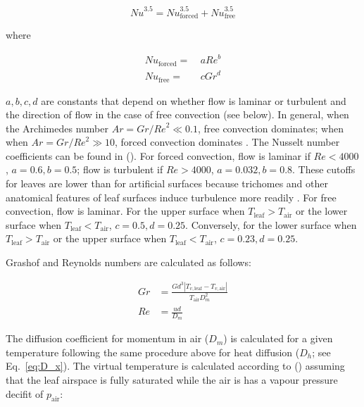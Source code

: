 \documentclass[11pt, oneside]{article}
\begin{document}
\begin{equation}
  \label{eq:nusselt}
  \mathit{Nu} ^ {3.5} = \mathit{Nu}_\mathrm{forced} ^ {3.5} + \mathit{Nu}_\mathrm{free} ^ {3.5}
\end{equation}

where

\begin{align}
  \mathit{Nu}_\mathrm{forced} =  & ~ a \mathit{Re} ^ b \\
  \mathit{Nu}_\mathrm{free} =    & ~ c \mathit{Gr} ^ d
\end{align}

$a, b, c, d$ are constants that depend on whether flow is laminar or turbulent and the direction of flow in the case of free convection (see below). In general, when the Archimedes number $\mathit{Ar} = \mathit{Gr} / \mathit{Re} ^ 2 \ll 0.1$, free convection dominates; when when $\mathit{Ar} = \mathit{Gr} / \mathit{Re} ^ 2 \gg 10$, forced convection dominates \citep{Nobel_2009}. The Nusselt number coefficients can be found in \citeauthor{Monteith_Unsworth_2013} (\citeyear{Monteith_Unsworth_2013}). For forced convection, flow is laminar if $\mathit{Re} < 4000$, $a = 0.6, b = 0.5$; flow is turbulent if $\mathit{Re} > 4000$, $a = 0.032, b = 0.8$. These cutoffs for leaves are lower than for artificial surfaces because trichomes and other anatomical features of leaf surfaces induce turbulence more readily \citep{Grace_Wilson_1976}. For free convection, flow is laminar. For the upper surface when $T_\mathrm{leaf} > T_\mathrm{air}$ or the lower surface when $T_\mathrm{leaf} < T_\mathrm{air}$, $c = 0.5, d = 0.25$. Conversely, for the lower surface when $T_\mathrm{leaf} > T_\mathrm{air}$ or the upper surface when $T_\mathrm{leaf} < T_\mathrm{air}$, $c = 0.23, d = 0.25$.

Grashof and Reynolds numbers are calculated as follows:

\begin{align}
  \mathit{Gr} & = \frac{G d ^ 3 |T_{v,\mathrm{leaf}} - T_{v,\mathrm{air}}|}{T_\mathrm{air} D_m ^ 2} \\
  \mathit{Re} & = \frac{u d}{D_m}
\end{align}

The diffusion coefficient for momentum in air ($D_m$) is calculated for a given temperature following the same procedure above for heat diffusion ($D_h$; see Eq.~\ref{eq:D_x}). The virtual temperature is calculated according to \citeauthor{Monteith_Unsworth_2013} (\citeyear{Monteith_Unsworth_2013}) assuming that the leaf airspace is fully saturated while the air is has a vapour pressure decifit of $p_\mathrm{air}$:
\end{document}
